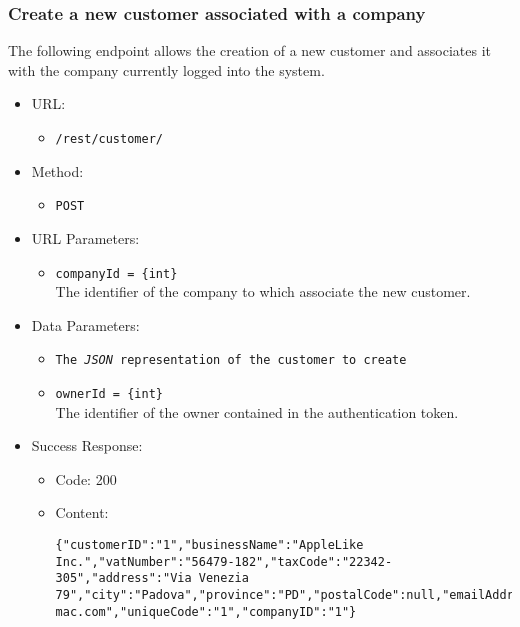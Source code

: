 \newpage
\subsubsection*{Create a new customer associated with a company}

The following endpoint allows the creation of a new customer and associates it with the company currently logged into the system.

\begin{itemize}

    \item URL:
    \begin{itemize}
        \item \texttt{/rest/customer/}
    \end{itemize}

    \item Method:
    \begin{itemize}
        \item \texttt{POST}
    \end{itemize}

    \item URL Parameters:
    \begin{itemize}
        \item \texttt{companyId = \{int\}} \\
        The identifier of the company to which associate the new customer.
    \end{itemize}

    \item Data Parameters:
    \begin{itemize}
        \item \texttt{The \textit{JSON} representation of the customer to create}
        \item \texttt{ownerId = \{int\}} \\
        The identifier of the owner contained in the authentication token.
    \end{itemize}

    \item Success Response:
    \begin{itemize}
        \item Code: 200
        \item Content:
        \begin{lstlisting}
{"customerID":"1","businessName":"AppleLike Inc.","vatNumber":"56479-182","taxCode":"22342-305","address":"Via Venezia 79","city":"Padova","province":"PD","postalCode":null,"emailAddress":"applelike@google.com","pec":"applelike@pec-mac.com","uniqueCode":"1","companyID":"1"}
        \end{lstlisting}
    \end{itemize}


\end{itemize}
